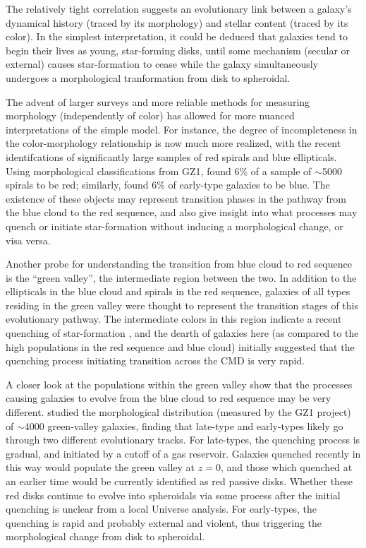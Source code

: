 \documentclass[useAMS,usenatbib]{mn2e}
\begin{document}
The relatively tight correlation suggests an evolutionary link between a galaxy's dynamical history (traced by its morphology) and stellar content (traced by its color). In the simplest interpretation, it could be deduced that galaxies tend to begin their lives as young, star-forming disks, until some mechanism (secular or external) causes star-formation to cease while the galaxy simultaneously undergoes a morphological tranformation from disk to spheroidal. 

The advent of larger surveys and more reliable methods for measuring morphology (independently of color) has allowed for more nuanced interpretations of the simple model. For instance, the degree of incompleteness in the color-morphology relationship is now much more realized, with the recent identifcations of significantly large samples of red spirals and blue ellipticals. Using morphological classifications from GZ1, \citet{Masters2010} found 6\% of a sample of $\sim$5000 spirals to be red; similarly, \citet{Schawinski2009} found 6\% of early-type galaxies to be blue. The existence of these objects may represent transition phases in the pathway from the blue cloud to the red sequence, and also give insight into what processes may quench or initiate star-formation without inducing a morphological change, or visa versa.

Another probe for understanding the transition from blue cloud to red sequence is the ``green valley'', the intermediate region between the two. In addition to the ellipticals in the blue cloud and spirals in the red sequence, galaxies of all types residing in the green valley were thought to represent the transition stages of this evolutionary pathway. The intermediate colors in this region indicate a recent quenching of star-formation \citep{Martin2007,Salim2007}, and the dearth of galaxies here (as compared to the high populations in the red sequence and blue cloud) initially suggested that the quenching process initiating transition across the CMD is very rapid.

A closer look at the populations within the green valley show that the processes causing galaxies to evolve from the blue cloud to red sequence may be very different. \citet{Schawinski2009} studied the morphological distribution (measured by the GZ1 project) of $\sim$4000 green-valley galaxies, finding that late-type and early-types likely go through two different evolutionary tracks. For late-types, the quenching process is gradual, and initiated by a cutoff of a gas reservoir. Galaxies quenched recently in this way would populate the green valley at $z=0$, and those which quenched at an earlier time would be currently identified as red passive disks. Whether these red disks continue to evolve into spheroidals via some process after the initial quenching is unclear from a local Universe analysis. For early-types, the quenching is rapid and probably external and violent, thus triggering the morphological change from disk to spheroidal.
\end{document}

